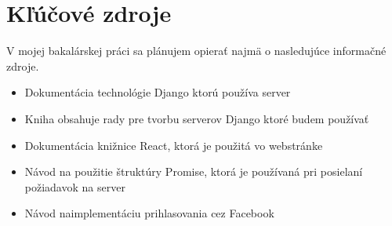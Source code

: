 \chapter*{Kľúčové zdroje}

V mojej bakalárskej práci sa plánujem opierať najmä o nasledujúce
informačné zdroje.

\begin{itemize}

\item {}

Dokumentácia technológie Django ktorú používa server

\item {}

Kniha obsahuje rady pre tvorbu serverov Django ktoré budem používať

\item {}

Dokumentácia knižnice React, ktorá je použitá vo webstránke

\item {}

Návod na použitie štruktúry Promise, ktorá je používaná pri posielaní požiadavok na server

\item {}

Návod naimplementáciu prihlasovania cez Facebook

\end{itemize}
